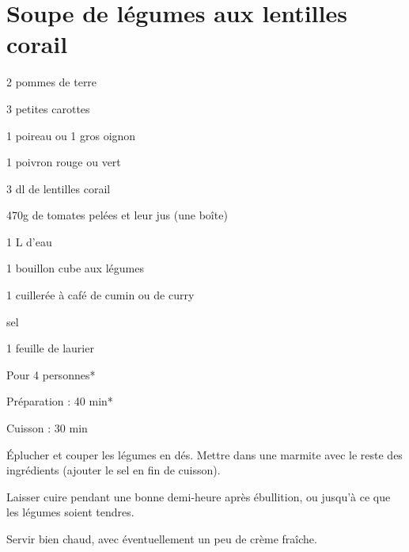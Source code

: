 \section{Soupe de légumes aux lentilles corail}

\begin{ingredients}
\item 2 pommes de terre
\item 3 petites carottes
\item 1 poireau ou 1 gros oignon
\item 1 poivron rouge ou vert
\item 3 dl de lentilles corail
\item 470g de tomates pelées et leur jus (une boîte)
\item 1 L d’eau
\item 1 bouillon cube aux légumes
\item 1 cuillerée à café de cumin ou de curry
\item sel
\item 1 feuille de laurier 
\end{ingredients}
\begin{infos}
\item Pour 4 personnes*			%
\item Préparation : 40 min*		%
\item Cuisson : 30 min			%
\end{infos}
\begin{etapes}
\item Éplucher et couper les légumes en dés. Mettre dans une marmite avec le reste des ingrédients (ajouter le sel en fin de cuisson).

\item Laisser cuire pendant une bonne demi-heure après ébullition, ou jusqu’à ce que les légumes soient tendres.

\item Servir bien chaud, avec éventuellement un peu de crème fraîche.
\end{etapes}
\begin{conseils}
\end{conseils}
